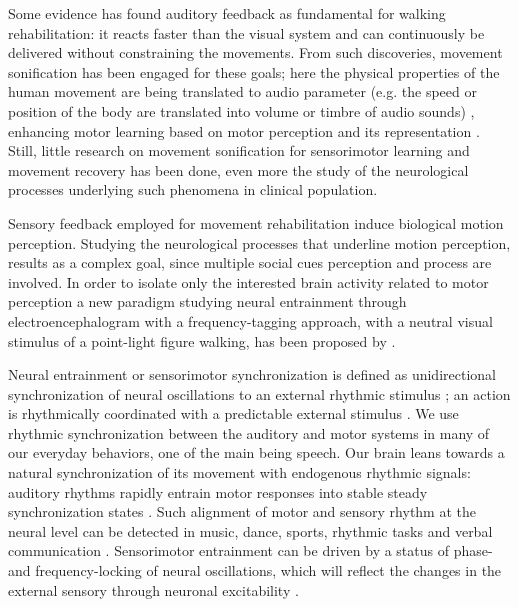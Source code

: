 Some evidence has found auditory feedback as fundamental for walking rehabilitation: it reacts faster than the visual system and can continuously be delivered without constraining the movements. From such discoveries, movement sonification has been engaged for these goals; here the physical properties of the human movement are being translated to audio parameter (e.g. the speed or position of the body are translated into volume or timbre of audio sounds) \parencite{Effenberg_2016}, enhancing motor learning based on motor perception and its representation \parencite{Bevilacqua_2016}. 
Still, little research on movement sonification for sensorimotor learning and movement recovery has been done, even more the study of the neurological processes underlying such phenomena in clinical population.

Sensory feedback employed for movement rehabilitation induce biological motion perception. Studying the neurological processes that underline motion perception, results as a complex goal, since multiple social cues perception and process are involved. In order to isolate only the interested brain activity related to motor perception a new paradigm studying neural entrainment through electroencephalogram with a frequency-tagging approach, with a neutral visual stimulus of a point-light figure walking, has been proposed by \cite{Cracco_2022}. 

Neural entrainment or sensorimotor synchronization is defined as unidirectional synchronization of neural oscillations to an external rhythmic stimulus \parencite{Lakatos_2019, Haegens_2018}; an action is rhythmically coordinated with a predictable external stimulus \parencite{Pressing_1999}. We use rhythmic synchronization between the auditory and motor systems in many of our everyday behaviors, one of the main being speech. Our brain leans towards a natural synchronization of its movement with endogenous rhythmic signals: auditory rhythms rapidly entrain motor responses into stable steady synchronization states \parencite{Thaut_2003}. Such alignment of motor and sensory rhythm at the neural level can be detected in music, dance, sports, rhythmic tasks and verbal communication \parencite{Rosso_2023}. Sensorimotor entrainment can be driven by a status of phase- and frequency-locking of neural oscillations, which will reflect the changes in the external sensory through neuronal excitability \parencite{Lakatos_2005}. 

